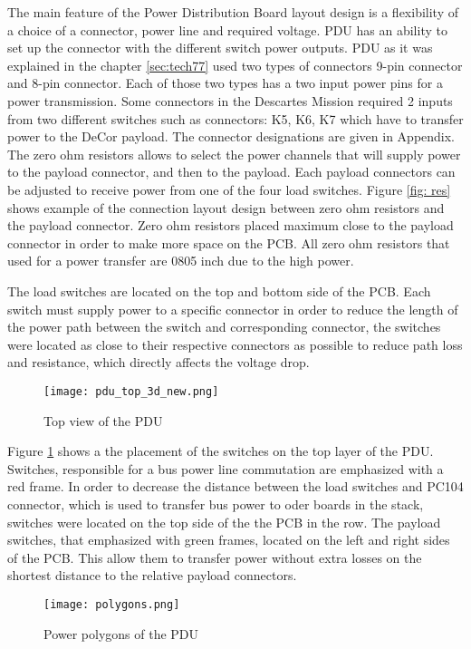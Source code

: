   
The main feature of the Power Distribution Board layout design is a flexibility of a choice of a connector, power line and required voltage. PDU has an ability to set up the connector with the different switch power outputs. PDU as it was explained in the chapter \ref{sec:tech77} used two types of connectors 9-pin connector and 8-pin connector. Each of those two types has a two input power pins for a power transmission.  Some connectors in the Descartes Mission required 2 inputs from two different switches such as connectors: K5, K6, K7 which have to transfer power to the DeCor payload. The connector designations are given in Appendix. The zero ohm resistors allows to select the power channels that will supply power to the payload connector, and then to the payload. Each payload connectors can be adjusted to receive power from one of the four load switches. Figure \ref{fig: res} shows example of the connection layout design between zero ohm resistors and the payload connector. Zero ohm resistors placed maximum close to the payload connector in order to make more space on the PCB. All zero ohm resistors that used for a power transfer are 0805 inch due to the high power.

The load switches are located on the top and bottom side of the PCB. Each switch must supply power to a specific connector in order to reduce the length of the power path between the switch and  corresponding connector, the switches were located as close to their respective connectors as possible to reduce path loss and resistance, which directly affects the voltage drop. 

\begin{figure}[h]
	\centering
	\texttt{[image: pdu\_top\_3d\_new.png]}
	\caption{Top view of the PDU}
	\label{fig: toppducon}
\end{figure} 

Figure \ref{fig: toppducon} shows a the placement of the switches on the top layer of the PDU. Switches, responsible for a bus power line commutation are emphasized with a red frame. In order to decrease the distance between the load switches and PC104 connector, which is used to transfer bus power to oder boards in the stack, switches were located on the top side of the the PCB in the row. The payload switches, that emphasized with green frames, located on the left and right sides of the PCB. This allow them to transfer power without extra losses on the shortest distance to the relative payload connectors.

\begin{figure}[h]
	\centering
	\texttt{[image: polygons.png]}
	\caption{Power polygons of the PDU}
	\label{fig: poly}
\end{figure} 

